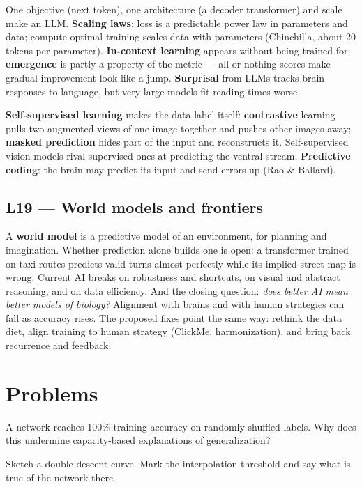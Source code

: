 \documentclass[11pt]{article}
\begin{document}
One objective (next token), one architecture (a decoder transformer) and scale
make an LLM. \textbf{Scaling laws}: loss is a predictable power law in
parameters and data; compute-optimal training scales data with parameters
(Chinchilla, about 20 tokens per parameter). \textbf{In-context learning}
appears without being trained for; \textbf{emergence} is partly a property of the
metric --- all-or-nothing scores make gradual improvement look like a jump.
\textbf{Surprisal} from LLMs tracks brain responses to language, but very large
models fit reading times worse.

\textbf{Self-supervised learning} makes the data label itself:
\textbf{contrastive} learning pulls two augmented views of one image together and
pushes other images away; \textbf{masked prediction} hides part of the input and
reconstructs it. Self-supervised vision models rival supervised ones at
predicting the ventral stream. \textbf{Predictive coding}: the brain may predict
its input and send errors up (Rao \& Ballard).

\subsection{L19 --- World models and frontiers}

A \textbf{world model} is a predictive model of an environment, for planning and
imagination. Whether prediction alone builds one is open: a transformer trained
on taxi routes predicts valid turns almost perfectly while its implied street map
is wrong. Current AI breaks on robustness and shortcuts, on visual and abstract
reasoning, and on data efficiency. And the closing question: \emph{does better AI
mean better models of biology?} Alignment with brains and with human strategies
can fall as accuracy rises. The proposed fixes point the same way: rethink the
data diet, align training to human strategy (ClickMe, harmonization), and bring
back recurrence and feedback.

\section{Problems}

 A network reaches 100\% training accuracy on randomly shuffled labels.
Why does this undermine capacity-based explanations of generalization?

 Sketch a double-descent curve. Mark the interpolation threshold and say
what is true of the network there.
\end{document}
